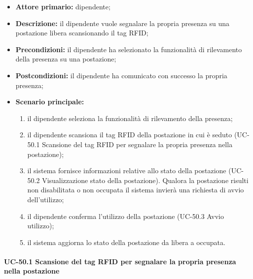     \begin{itemize}
        \item \textbf{Attore primario:} dipendente;

        \item \textbf{Descrizione:} il dipendente vuole segnalare la propria presenza su una postazione libera scansionando il tag RFID;

        \item \textbf{Precondizioni:} il dipendente ha selezionato la funzionalità di rilevamento della presenza su una postazione;

        \item \textbf{Postcondizioni:} il dipendente ha comunicato con successo la propria presenza;

        \item \textbf{Scenario principale:}
            \begin{enumerate}
                \item il dipendente seleziona la funzionalità di rilevamento della presenza;
                \item il dipendente scansiona il tag RFID della postazione in cui è seduto (UC-50.1 Scansione del tag RFID per segnalare la propria presenza nella postazione);
                \item il sistema fornisce informazioni relative allo stato della postazione (UC-50.2 Visualizzazione stato della postazione). Qualora la postazione risulti non disabilitata o non occupata il sistema invierà una richiesta di avvio dell'utilizzo;
                \item il dipendente conferma l'utilizzo della postazione (UC-50.3 Avvio utilizzo);
                \item il sistema aggiorna lo stato della postazione da libera a occupata.
            \end{enumerate}
    \end{itemize} 


\paragraph{UC-50.1 Scansione del tag RFID per segnalare la propria presenza nella postazione}
   
